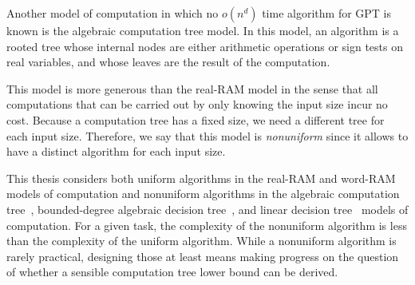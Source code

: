 Another model of computation in which no \(o(n^d)\) time algorithm for GPT
is known is the algebraic computation tree model. In this model,
an algorithm is a rooted tree whose internal nodes are either arithmetic operations or
sign tests on real variables, and whose leaves are the result of the computation.

This model is
more generous than the real-RAM model in the sense that all computations that
can be carried out by only knowing the input size incur no cost.
%
Because a computation tree has a fixed size, we need a different tree for each
input size.
%
Therefore,
we say that this model is \emph{nonuniform} since it allows to have a
distinct algorithm for each input size.

This thesis considers both uniform algorithms in the real-RAM and word-RAM
models of computation and nonuniform algorithms
in the algebraic computation tree~\cite[Section~2]{Be83},
bounded-degree algebraic decision tree~\cite[Section~2]{SY82},
and linear decision tree~\cite[Section~2]{DL78} models of computation.
%
For a given task, the complexity of the nonuniform algorithm is less than
the complexity of the uniform algorithm. While a nonuniform algorithm is rarely
practical, designing those at least means making progress on the question of
whether a sensible computation tree lower bound can be derived.
